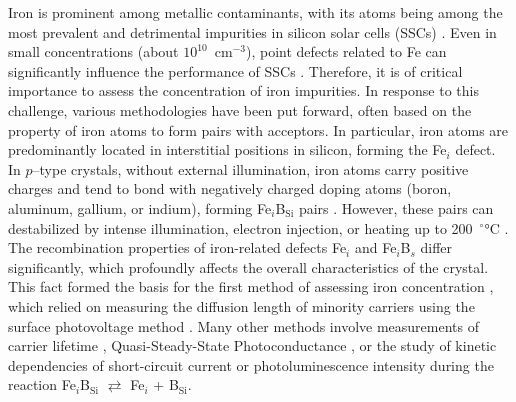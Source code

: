 \documentclass[a4paper,fleqn]{cas-sc}
\begin{document}
Iron is prominent among metallic contaminants, with its atoms being among
the most prevalent and detrimental impurities in silicon solar cells (SSCs) \cite{Buonassisi2006}.
Even in small concentrations (about $10^{10}$~cm$^{-3}$), 
point defects related to Fe can significantly influence the performance of SSCs \cite{Schubert2015,Herguth2022}. 
Therefore, it is of critical importance to assess the concentration of iron impurities. 
In response to this challenge, various methodologies have been put forward, 
often based on the property of iron atoms to form pairs with acceptors. 
In particular, iron atoms are predominantly located in interstitial positions in silicon, forming the Fe$_i$ defect. 
In $p$--type crystals, without external illumination, iron atoms carry positive charges and tend to bond with negatively charged doping atoms 
(boron, aluminum, gallium, or indium), forming Fe$_i$B$_\mathrm{Si}$ pairs \cite{Kimerling1983}. 
However, these pairs can destabilized by intense illumination, electron injection, or heating up to 200~$^\circ$°C \cite{FeBAssJAP2014}. 
The recombination properties of iron-related defects Fe$_i$ and Fe$_i$B$_s$ differ significantly, 
which profoundly affects the overall characteristics of the crystal. 
This fact formed the basis for the first method of assessing iron concentration \cite{Zoth1990}, 
which relied on measuring the diffusion length of minority carriers using the surface photovoltage method \cite{Tousek2008}. 
Many other methods involve measurements of carrier lifetime \cite{Rein2,Schmidt2005}, 
Quasi-Steady-State Photoconductance \cite{Goodarzi2017}, 
or the study of kinetic dependencies of short-circuit current \cite{Olikh2021JAP} 
or photoluminescence intensity \cite{FeMethod2012} during the reaction Fe$_i$B$_\mathrm{Si}$ $\rightleftarrows$ Fe$_i$ + B$_\mathrm{Si}$.
\end{document}
